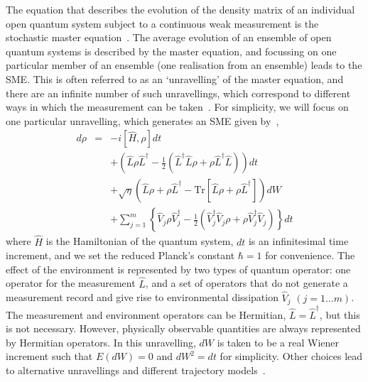 \documentclass[conference]{IEEEtran}
\begin{document}
The equation that describes the evolution of the density matrix of an individual open quantum system subject to a continuous weak measurement is the stochastic master equation~\cite{Bel1999,Wis2010,Jac2014}. The average evolution of an ensemble of open quantum systems is described by the master equation, and focussing on one particular member of an ensemble (one realisation from an ensemble) leads to the SME. This is often referred to as an `unravelling' of the master equation, and there are an infinite number of such unravellings, which correspond to different ways in which the measurement can be taken~\cite{Wis2005}. For simplicity, we will focus on one particular unravelling, which generates an SME given by~\cite{Wis2010,Jac2014},
\begin{eqnarray}\label{sme1}
d\rho&=&- i \left[\hat{H},\rho\right]dt \nonumber\\
&&+\left( \hat{L}\rho \hat{L}^{\dagger} -\frac{1}{2}\left(\hat{L}^{\dagger} \hat{L} \rho 
+ \rho \hat{L}^{\dagger}\hat{L} \right)\right)dt   \nonumber\\
&&+ \sqrt{\eta}\left(\hat{L}\rho+\rho \hat{L}^{\dagger}-\mathrm{Tr}[\hat{L}\rho+\rho \hat{L}^{\dagger}] \right)dW \nonumber\\
&&+\sum_{j=1}^{m} \left\{ \hat{V}_{j} \rho\hat{V}^{\dagger}_{j} -\frac{1}{2}\left(\hat{V}^{\dagger}_{j} \hat{V}_{j} \rho 
+ \rho \hat{V}^{\dagger}_{j} \hat{V}_{j} \right)\right\}dt  
\end{eqnarray}
where $\hat{H}$ is the Hamiltonian of the quantum system, $dt$ is an infinitesimal time increment, and we set the reduced Planck's constant $\hbar = 1$ for convenience. The effect of the environment is represented by two types of quantum operator: one operator for the measurement $\hat{L}$, and a set of operators that do not generate a measurement record and give rise to environmental dissipation $\hat{V}_j$  $(j = 1\dots m)$. The measurement and environment operators can be Hermitian, $\hat{L} =\hat{L}^{\dagger}$, but this is not necessary. However, physically observable quantities are always represented by Hermitian operators. In this unravelling, $dW$ is taken to be a real Wiener increment such that $E(dW)=0$ and $dW^2  = dt$ for simplicity. Other choices lead to alternative unravellings and different trajectory models~\cite{Wis2005}.
\end{document}
